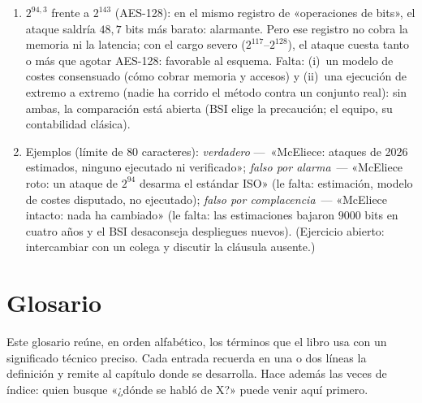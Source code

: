 \documentclass[11pt,a4paper,oneside]{report}
\begin{document}
\begin{enumerate}[leftmargin=1.9em,itemsep=4pt]
        cifra concreta $2^{102{,}4}$ depende de la contabilidad.
        (c)~Heurística y disputada: la afirmación de Vedenev
        «esencialmente una ejecución» no está verificada de forma
        independiente (hay réplicas y contra-réplicas). (d)~Hecho
        (negativo y verificable): nadie ha ejecutado el cómputo de
        núcleos contra un conjunto real; los retos TII tienen
        $n=214$.
  \item $2^{94{,}3}$ frente a $2^{143}$ (AES-128): en el mismo
        registro de «operaciones de bits», el ataque saldría
        $48{,}7$ bits más barato: alarmante. Pero ese registro no
        cobra la memoria ni la latencia; con el cargo severo
        ($2^{117}$--$2^{128}$), el ataque cuesta tanto o más que
        agotar AES-128: favorable al esquema. Falta: (i)~un modelo
        de costes consensuado (cómo cobrar memoria y accesos) y
        (ii)~una ejecución de extremo a extremo (nadie ha corrido
        el método contra un conjunto real): sin ambas, la
        comparación está abierta (BSI elige la precaución; el
        equipo, su contabilidad clásica).
  \item Ejemplos (límite de $80$ caracteres):
        \emph{verdadero} ---~«McEliece: ataques de 2026 estimados,
        ninguno ejecutado ni verificado»; \emph{falso por
        alarma}~--- «McEliece roto: un ataque de $2^{94}$ desarma
        el estándar ISO» (le falta: estimación, modelo de costes
        disputado, no ejecutado); \emph{falso por
        complacencia}~--- «McEliece intacto: nada ha cambiado»
        (le falta: las estimaciones bajaron $9000$ bits en cuatro
        años y el BSI desaconseja despliegues nuevos). (Ejercicio
        abierto: intercambiar con un colega y discutir la cláusula
        ausente.)
\end{enumerate}


\chapter{Glosario}\label{ch:glosario}

\begin{roadmap}
Este glosario reúne, en orden alfabético, los términos que el libro
usa con un significado técnico preciso. Cada entrada recuerda en una
o dos líneas la definición y remite al capítulo donde se desarrolla.
Hace además las veces de índice: quien busque «¿dónde se habló de
X?» puede venir aquí primero.
\end{roadmap}
\end{document}
